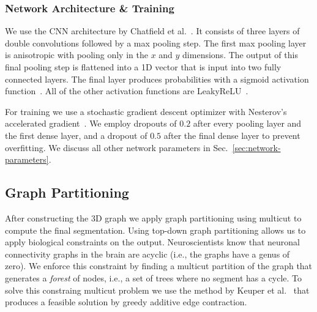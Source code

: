 \subsubsection{Network Architecture \& Training}

We use the CNN architecture by Chatfield et al.~\cite{chatfield2014return}. It consists of three layers of double convolutions followed by a max pooling step. The first max pooling layer is anisotropic with pooling only in the $x$ and $y$ dimensions. The output of this final pooling step is flattened into a 1D vector that is input into two fully connected layers. The final layer produces probabilities with a sigmoid activation function~\cite{funahashi1989approximate}. All of the other activation functions are LeakyReLU~\cite{maas2013rectifier}.

For training we use a stochastic gradient descent optimizer with Nesterov's accelerated gradient~\cite{nesterov1983method}. We employ dropouts of $0.2$ after every pooling layer and the first dense layer, and a dropout of $0.5$ after the final dense layer to prevent overfitting. We discuss all other network parameters in Sec.~\ref{sec:network-parameters}.


\subsection{Graph Partitioning}

After constructing the 3D graph we apply graph partitioning using multicut to compute the final segmentation. Using top-down graph partitioning allows us to apply biological constraints on the output. Neuroscientists know that neuronal connectivity graphs in the brain are acyclic (i.e., the graphs have a genus of zero). We enforce this constraint by finding a multicut partition of the graph that generates a \textit{forest} of nodes, i.e., a set of trees where no segment has a cycle. To solve this constraing multicut problem we use the method by Keuper et al.~\cite{keuper2015efficient} that produces a feasible solution by greedy additive edge contraction.
